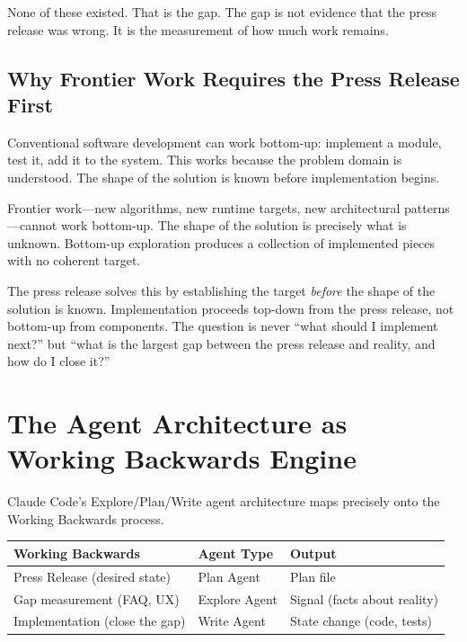 \documentclass[11pt,a4paper]{article}
\begin{document}
None of these existed.  That is the gap.  The gap is not evidence that the
press release was wrong.  It is the measurement of how much work remains.

\subsection{Why Frontier Work Requires the Press Release First}

Conventional software development can work bottom-up: implement a module,
test it, add it to the system.  This works because the problem domain is
understood.  The shape of the solution is known before implementation begins.

Frontier work---new algorithms, new runtime targets, new architectural
patterns---cannot work bottom-up.  The shape of the solution is precisely what
is unknown.  Bottom-up exploration produces a collection of implemented pieces
with no coherent target.

The press release solves this by establishing the target \emph{before} the
shape of the solution is known.  Implementation proceeds top-down from the
press release, not bottom-up from components.  The question is never ``what
should I implement next?'' but ``what is the largest gap between the press
release and reality, and how do I close it?''

\section{The Agent Architecture as Working Backwards Engine}

Claude Code's Explore/Plan/Write agent architecture maps precisely onto the
Working Backwards process.

\begin{center}
\begin{tabular}{@{}lll@{}}
  \toprule
  \textbf{Working Backwards} & \textbf{Agent Type} & \textbf{Output} \\
  \midrule
  Press Release (desired state)     & Plan Agent    & Plan file \\
  Gap measurement (FAQ, UX)         & Explore Agent & Signal (facts about reality) \\
  Implementation (close the gap)    & Write Agent   & State change (code, tests) \\
  \bottomrule
\end{tabular}
\end{center}
\end{document}
